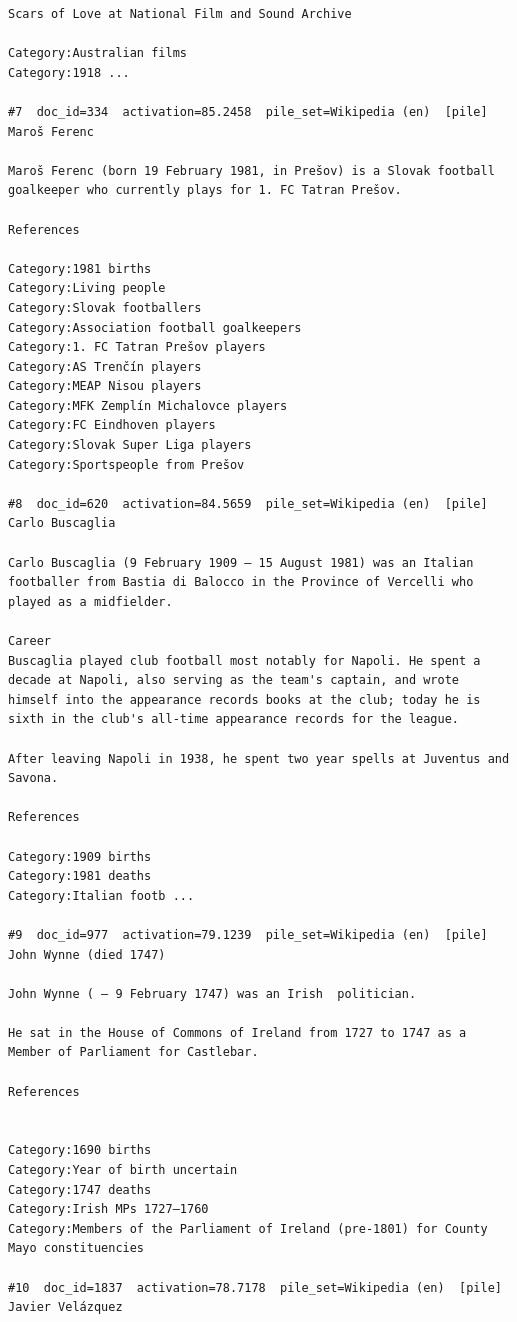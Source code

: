 \begin{verbatim}
Scars of Love at National Film and Sound Archive

Category:Australian films
Category:1918 ...

#7  doc_id=334  activation=85.2458  pile_set=Wikipedia (en)  [pile]
Maroš Ferenc

Maroš Ferenc (born 19 February 1981, in Prešov) is a Slovak football goalkeeper who currently plays for 1. FC Tatran Prešov.

References

Category:1981 births
Category:Living people
Category:Slovak footballers
Category:Association football goalkeepers
Category:1. FC Tatran Prešov players
Category:AS Trenčín players
Category:MEAP Nisou players
Category:MFK Zemplín Michalovce players
Category:FC Eindhoven players
Category:Slovak Super Liga players
Category:Sportspeople from Prešov

#8  doc_id=620  activation=84.5659  pile_set=Wikipedia (en)  [pile]
Carlo Buscaglia

Carlo Buscaglia (9 February 1909 – 15 August 1981) was an Italian footballer from Bastia di Balocco in the Province of Vercelli who played as a midfielder.

Career
Buscaglia played club football most notably for Napoli. He spent a decade at Napoli, also serving as the team's captain, and wrote himself into the appearance records books at the club; today he is sixth in the club's all-time appearance records for the league.

After leaving Napoli in 1938, he spent two year spells at Juventus and Savona.

References

Category:1909 births
Category:1981 deaths
Category:Italian footb ...

#9  doc_id=977  activation=79.1239  pile_set=Wikipedia (en)  [pile]
John Wynne (died 1747)

John Wynne ( – 9 February 1747) was an Irish  politician.

He sat in the House of Commons of Ireland from 1727 to 1747 as a Member of Parliament for Castlebar.

References 
 

Category:1690 births
Category:Year of birth uncertain
Category:1747 deaths
Category:Irish MPs 1727–1760
Category:Members of the Parliament of Ireland (pre-1801) for County Mayo constituencies

#10  doc_id=1837  activation=78.7178  pile_set=Wikipedia (en)  [pile]
Javier Velázquez


\end{verbatim}
